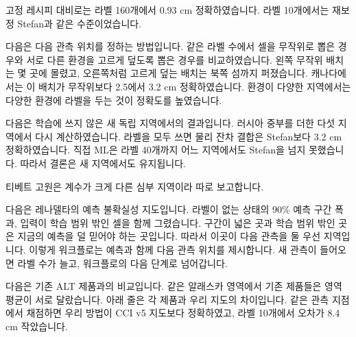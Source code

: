 
\begin{optbox}
고정 레시피 대비로는 라벨 160개에서 0.93 cm 정확하였습니다. 라벨 10개에서는 재보정 Stefan과 같은 수준이었습니다.
\end{optbox}


다음은 다음 관측 위치를 정하는 방법입니다. 같은 라벨 수에서 셀을 무작위로 뽑은 경우와 서로 다른 환경을 고르게 덮도록 뽑은 경우를 비교하였습니다. 왼쪽 무작위 배치는 몇 곳에 몰렸고, 오른쪽처럼 고르게 덮는 배치는 북쪽 섬까지 퍼졌습니다. 캐나다에서는 이 배치가 무작위보다 2.5에서 3.2 cm 정확하였습니다. 환경이 다양한 지역에서는 다양한 환경에 라벨을 두는 것이 정확도를 높였습니다.



다음은 학습에 쓰지 않은 새 독립 지역에서의 결과입니다. 러시아 중부를 더한 다섯 지역에서 다시 계산하였습니다. 라벨을 모두 쓰면 물리 잔차 결합은 Stefan보다 3.2 cm 정확하였습니다. 직접 ML은 라벨 40개까지 어느 지역에서도 Stefan을 넘지 못했습니다. 따라서 결론은 새 지역에서도 유지됩니다.


\begin{optbox}
티베트 고원은 계수가 크게 다른 심부 지역이라 따로 보고합니다.
\end{optbox}


다음은 레나델타의 예측 불확실성 지도입니다. 라벨이 없는 상태의 90\% 예측 구간 폭과, 입력이 학습 범위 밖인 셀을 함께 그렸습니다. 구간이 넓은 곳과 학습 범위 밖인 곳은 지금의 예측을 덜 믿어야 하는 곳입니다. 따라서 이곳이 다음 관측을 둘 우선 지역입니다. 이렇게 워크플로는 예측과 함께 다음 관측 위치를 제시합니다. 새 관측이 들어오면 라벨 수가 늘고, 워크플로의 다음 단계로 넘어갑니다.



다음은 기존 ALT 제품과의 비교입니다. 같은 알래스카 영역에서 기존 제품들은 영역 평균이 서로 달랐습니다. 아래 줄은 각 제품과 우리 지도의 차이입니다. 같은 관측 지점에서 채점하면 우리 방법이 CCI v5 지도보다 정확하였고, 라벨 10개에서 오차가 8.4 cm 작았습니다.

